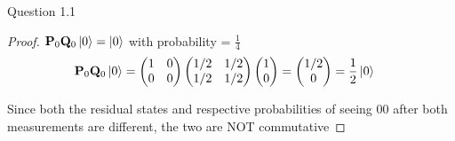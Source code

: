 \begin{solution}{Question 1.1}
\begin{proof}
     $\mathbf{P}_0\mathbf{Q}_0\ket{0}=\ket{0}$ with probability = $\frac{1}{4}$
     \begin{equation}
         \begin{split}
            &\mathbf{P}_0\mathbf{Q}_0\ket{0} = 
            \begin{pmatrix}
            1 & 0\\
            0 & 0 
            \end{pmatrix}
            \begin{pmatrix}
            1/2 & 1/2\\
            1/2 & 1/2 
            \end{pmatrix}
            \begin{pmatrix}
            1 \\
            0 
            \end{pmatrix} =
            \begin{pmatrix}
            1/2 \\
            0 
            \end{pmatrix} = 
            \frac{1}{2}\ket{0}
        \end{split}
     \end{equation}

    Since both the residual states and respective probabilities of seeing 00 after both measurements are different, the two are NOT commutative


    
    \end{proof}
\end{solution}
